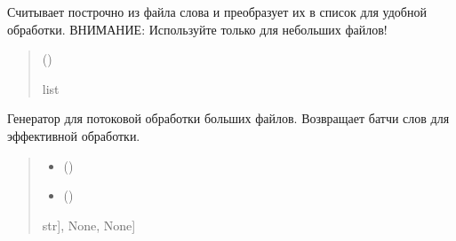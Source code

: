 \documentclass[a4paper,11pt,russian,openany,oneside]{sphinxmanual}
\begin{document}
\begin{savenotes}\begin{fulllineitems}
\label{\detokenize{scan_module:scan_module.read_files.get_words_from_file}}
\pysigstartsignatures
\pysiglinewithargsret
{}
{}
{}
\pysigstopsignatures
\sphinxAtStartPar
Считывает построчно из файла слова и преобразует
их в список для удобной обработки.
ВНИМАНИЕ: Используйте только для небольших файлов!
\begin{quote}\begin{description}
\sphinxAtStartPar
{} ()

\sphinxAtStartPar
list

\end{description}\end{quote}

\end{fulllineitems}\end{savenotes}


\begin{savenotes}\begin{fulllineitems}
\label{\detokenize{scan_module:scan_module.read_files.get_words_from_file_stream}}
\pysigstartsignatures
\pysiglinewithargsret
{}
{\sphinxparamcomma {}}
{}
\pysigstopsignatures
\sphinxAtStartPar
Генератор для потоковой обработки больших файлов.
Возвращает батчи слов для эффективной обработки.
\begin{quote}\begin{description}
\begin{itemize}
\item {} 
\sphinxAtStartPar
{} ()

\item {} 
\sphinxAtStartPar
{} ()

\end{itemize}

\sphinxAtStartPar
\sphinxstyleemphasis{Generator}{[}\sphinxstyleemphasis{List}{[}str{]}, None, None{]}

\end{description}\end{quote}

\end{fulllineitems}\end{savenotes}
\end{document}
